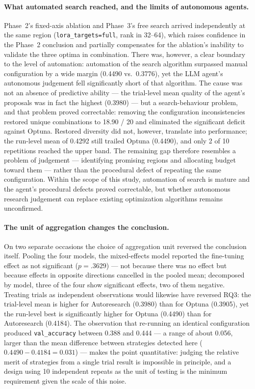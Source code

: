 \paragraph{What automated search reached, and the limits of autonomous agents.}
Phase~2's fixed-axis ablation and Phase~3's free search arrived independently at
the same region (\texttt{lora\_targets=full}, rank in 32--64), which raises
confidence in the Phase~2 conclusion and partially compensates for the ablation's
inability to validate the three optima in combination. There was, however, a
clear boundary to the level of automation: automation of the search algorithm
surpassed manual configuration by a wide margin (0.4490 vs.\ 0.3776), yet the LLM
agent's autonomous judgement fell significantly short of that algorithm. The
cause was not an absence of predictive ability --- the trial-level mean quality of
the agent's proposals was in fact the highest (0.3980) --- but a search-behaviour
problem, and that problem proved correctable: removing the configuration
inconsistencies restored unique combinations to 18.90 / 20 and eliminated the
significant deficit against Optuna. Restored diversity did not, however,
translate into performance; the run-level mean of 0.4292 still trailed Optuna
(0.4490), and only 2 of 10 repetitions reached the upper band. The remaining gap
therefore resembles a problem of judgement --- identifying promising regions and
allocating budget toward them --- rather than the procedural defect of repeating
the same configuration. Within the scope of this study, automation of search is
mature and the agent's procedural defects proved correctable, but whether
autonomous research judgement can replace existing optimization algorithms remains
unconfirmed.

\paragraph{The unit of aggregation changes the conclusion.}
On two separate occasions the choice of aggregation unit reversed the conclusion
itself. Pooling the four models, the mixed-effects model reported the fine-tuning
effect as not significant ($p = .3629$) --- not because there was no effect but
because effects in opposite directions cancelled in the pooled mean; decomposed
by model, three of the four show significant effects, two of them negative.
Treating trials as independent observations would likewise have reversed RQ3: the
trial-level mean is higher for Autoresearch (0.3980) than for Optuna (0.3905),
yet the run-level best is significantly higher for Optuna (0.4490) than for
Autoresearch (0.4184). The observation that re-running an identical configuration
produced \texttt{val\_accuracy} between 0.388 and 0.444 --- a range of about
0.056, larger than the mean difference between strategies detected here
($0.4490 - 0.4184 = 0.031$) --- makes the point quantitative: judging the relative
merit of strategies from a single trial result is impossible in principle, and a
design using 10 independent repeats as the unit of testing is the minimum
requirement given the scale of this noise.

